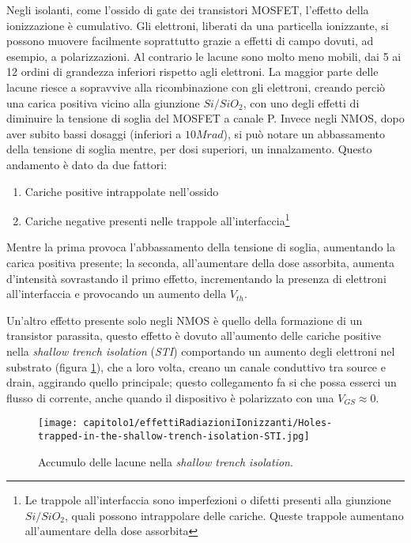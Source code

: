Negli isolanti, come l'ossido di gate dei transistori MOSFET, l'effetto della ionizzazione è cumulativo. Gli elettroni, liberati da una particella ionizzante, si possono muovere facilmente soprattutto grazie a effetti di campo dovuti, ad esempio, a polarizzazioni.
Al contrario le lacune sono molto meno mobili, dai 5 ai 12 ordini di grandezza inferiori rispetto agli elettroni. La maggior parte delle lacune riesce a sopravvive alla ricombinazione con gli elettroni, creando perciò una carica positiva vicino alla giunzione $Si/SiO_2$, con uno degli effetti di diminuire la tensione di soglia del MOSFET a canale P. Invece negli NMOS, dopo aver subito bassi dosaggi (inferiori a $10Mrad$), si può notare un abbassamento della tensione di soglia mentre, per dosi superiori, un innalzamento. Questo andamento è dato da due fattori:
\begin{enumerate}
	\item Cariche positive intrappolate nell'ossido
	\item Cariche negative presenti nelle trappole all'interfaccia\footnote{Le trappole all'interfaccia sono imperfezioni o difetti presenti alla giunzione $Si/SiO_2$, quali possono intrappolare delle cariche. Queste trappole aumentano all'aumentare della dose assorbita}
\end{enumerate}
Mentre la prima provoca l'abbassamento della tensione di soglia, aumentando la carica positiva presente; la seconda, all'aumentare della dose assorbita, aumenta d'intensità sovrastando il primo effetto, incrementando la presenza di elettroni all'interfaccia e provocando un aumento della $V_{th}$.  

\vspace{0.5cm}

Un'altro effetto presente solo negli NMOS è quello della formazione di un transistor parassita\cite{effetti_radiazioni:CMOS_IC_radiation_hardening_by_design}, questo effetto è dovuto all'aumento delle cariche positive nella \textit{shallow trench isolation} (\textit{STI}) comportando un aumento degli elettroni nel substrato (figura \ref{fig:accumulo_lacune_STI}), che a loro volta, creano un canale conduttivo tra source e drain, aggirando quello principale; questo collegamento fa si che possa esserci un flusso di corrente, anche quando il dispositivo è polarizzato con una $V_{GS} \approx 0$.

\begin{figure}[ht]
	\centering

	\texttt{[image: capitolo1/effettiRadiazioniIonizzanti/Holes-trapped-in-the-shallow-trench-isolation-STI.jpg]}

	\caption[Lacune nella \textit{STI}]{Accumulo delle lacune nella \textit{shallow trench isolation}\cite{effetti_radiazioni:CMOS_IC_radiation_hardening_by_design}.}
	\label{fig:accumulo_lacune_STI}

\end{figure}


